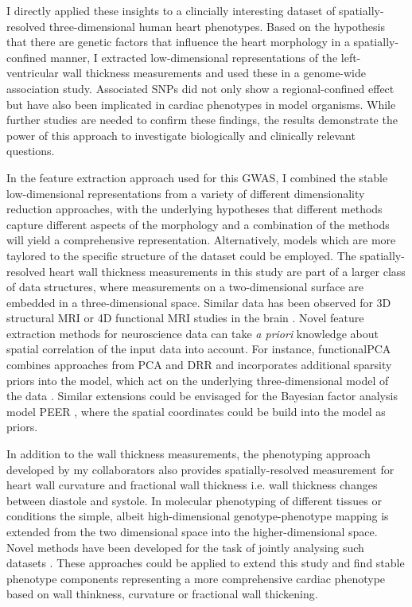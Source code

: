 I directly applied these insights to a clincially interesting dataset of spatially-resolved three-dimensional human heart phenotypes. Based on the hypothesis that there are genetic factors that influence the heart morphology in a spatially-confined manner, I extracted low-dimensional representations of the left-ventricular wall thickness measurements and used these in a genome-wide association study. Associated SNPs did not only show a regional-confined effect but have also been implicated in cardiac phenotypes in model organisms. While further studies are needed to confirm these findings, the results demonstrate the power of this approach to investigate biologically and clinically relevant questions.

In the feature extraction approach used for this GWAS, I combined the stable low-dimensional representations from a variety of different dimensionality reduction approaches, with the underlying hypotheses that different methods capture different aspects of the morphology and a combination of the methods will yield a comprehensive representation. Alternatively, models which are more taylored to the specific structure of the dataset could be employed. The spatially-resolved heart wall thickness measurements in this study are part of a larger class of data structures, where measurements on a two-dimensional surface are embedded in a three-dimensional space. Similar data has been observed for 3D structural MRI or 4D functional MRI studies in the brain \citep{vanEssen2012,Glasser2013}. Novel feature extraction methods for neuroscience data can take \textit{a priori} knowledge about spatial correlation of the input data into account. For instance, functionalPCA combines approaches from PCA and DRR and incorporates additional sparsity priors into the model, which act on the underlying three-dimensional model of the data \citep{Lila2016}. Similar extensions could be envisaged for the Bayesian factor analysis model PEER \citep{Stegle2012}, where the spatial coordinates could be build into the model as priors.

In addition to the wall thickness measurements, the phenotyping approach developed by my collaborators also provides spatially-resolved measurement for heart wall curvature and fractional wall thickness i.e. wall thickness changes between diastole and systole. In molecular phenotyping of different tissues or conditions the simple, albeit high-dimensional genotype-phenotype mapping is extended from the two dimensional  space into the higher-dimensional  space. Novel methods have been developed for the task of jointly analysing such datasets \citep{Hore2016}. These approaches could be applied to extend this study and find stable phenotype components representing a more comprehensive cardiac phenotype based on wall thinkness, curvature or fractional wall thickening. 


